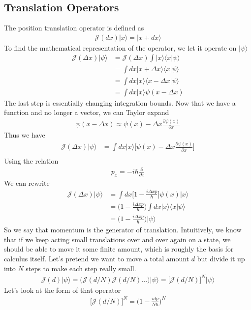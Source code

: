 \subsection{Translation Operators}
The position translation operator is defined as 
\begin{align}
\mathcal{J}(dx)|x\rangle = |x+dx\rangle
\end{align}
To find the mathematical representation of the operator, we let it operate on $|\psi\rangle$
\begin{align}
\mathcal{J}(\Delta x)|\psi\rangle &= \mathcal{J}(\Delta x)\int |x\rangle \langle x|\psi
\rangle\\
&=\int dx |x+\Delta x\rangle \langle x|\psi
\rangle\\
&=\int dx|x\rangle \langle x-\Delta x|\psi
\rangle\\
&= \int dx|x\rangle \psi (x-\Delta x)
\end{align}
The last step is essentially changing integration bounds. Now that we have a function and no longer a vector, we can Taylor expand
\begin{align}
\psi(x-\Delta x) \approx \psi(x) -\Delta x\frac{\partial\psi(x)}{\partial x}
\end{align}
Thus we have
\begin{align}
\mathcal{J}(\Delta x)|\psi\rangle &= \int dx |x\rangle \Big[\psi(x) -\Delta x\frac{\partial\psi(x)}{\partial x}\Big]\\
\end{align}
Using the relation 
\begin{align}
\boxed{p_x= -i\hbar\frac{\partial}{\partial x}}
\end{align}
We can rewrite
\begin{align}
\mathcal{J}(\Delta x)|\psi\rangle &= \int dx \Big[1 -\frac{i \Delta x p}{\hbar}  \Big]\psi(x)|x\rangle \\
&= \Big(1-\frac{i\Delta xp}{\hbar}\Big)\int dx |x\rangle\langle x|\psi\rangle\\
&=\Big(1- \frac{i\Delta x p}{\hbar} \Big) |\psi\rangle 
\end{align}
So we say that momentum is the generator of translation. Intuitively, we know that if we keep acting small translations over and over again on a state, we should be able to move it some finite amount, which is roughly the basis for calculus itself. Let's pretend we want to move a total amount $d$ but divide it up into $N$ steps to make each step really small.
\begin{align}
    \mathcal{J}(d)|\psi\rangle = \Big(\mathcal{J}(d/N)\mathcal{J}(d/N)...\Big)|\psi\rangle = \Big[\mathcal{J}(d/N)\Big]^N|\psi\rangle
\end{align}
Let's look at the form of that operator
\begin{align}
    \Big[\mathcal{J}(d/N)\Big]^N = \Big(1- \frac{i d p}{N\hbar} \Big)^N
\end{align}

